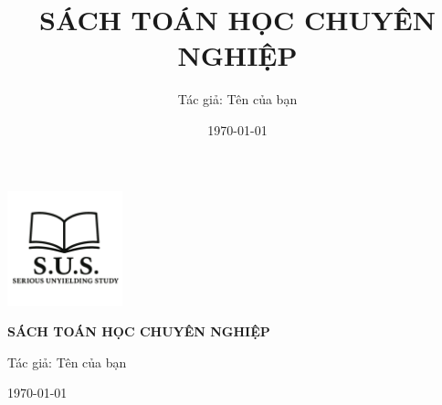 \documentclass[12pt,a4paper]{book}
\title{SÁCH TOÁN HỌC CHUYÊN NGHIỆP}
\author{Tác giả: Tên của bạn}
\date{\today}
\begin{document}
\frontmatter

\begin{titlepage}
    \centering
    \vspace*{2cm}
    
    \includegraphics[width=0.25\textwidth]{images/logo.png}
    
    \vspace{2cm}
    
    {\Huge\bfseries SÁCH TOÁN HỌC CHUYÊN NGHIỆP\par}
    
    \vspace{1.5cm}
    
    {\Large Tác giả: Tên của bạn\par}
    
    \vspace{1cm}
    
    {\large \today\par}
    
    \vfill
    
\end{titlepage}

\tableofcontents

\mainmatter

% 

\backmatter
% 
% 
\end{document}
